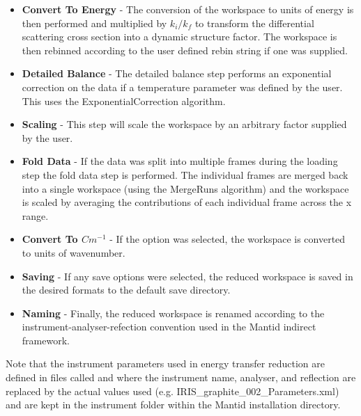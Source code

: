 \documentclass[paper=a4, fontsize=11pt]{scrartcl}	%
\numberwithin{equation}{section}															%
\numberwithin{figure}{section}																%
\numberwithin{table}{section}																%
\begin{document}
\begin{itemize}
\item \textbf{Convert To Energy} - The conversion of the workspace to units of energy is then performed and multiplied by $k_i / k_f$  to transform the differential scattering cross section into a dynamic structure factor. The workspace is then rebinned according to the user defined rebin string if one was supplied.

\item \textbf{Detailed Balance} - The detailed balance step performs an exponential correction on the data if a temperature parameter was defined by the user. This uses the ExponentialCorrection algorithm.

\item \textbf{Scaling} - This step will scale the workspace by an arbitrary factor supplied by the user.

\item \textbf{Fold Data} - If the data was split into multiple frames during the loading step the fold data step is performed. The individual frames are merged back into a single workspace (using the MergeRuns algorithm) and the workspace is scaled by averaging the contributions of each individual frame across the x range.

\item \textbf{Convert To $Cm^{-1}$} - If the option was selected, the workspace is converted to units of wavenumber.

\item \textbf{Saving} - If any save options were selected, the reduced workspace is saved in the desired formats to the default save directory.
\item \textbf{Naming} - Finally, the reduced workspace is renamed according to the instrument-analyser-refection convention used in the Mantid indirect framework.
\end{itemize}

Note that the instrument parameters used in energy transfer reduction are defined in files called  and  where the instrument name, analyser, and reflection are replaced by the actual values used (e.g. IRIS\_graphite\_002\_Parameters.xml) and are kept in the instrument folder within the Mantid installation directory.
\end{document}
